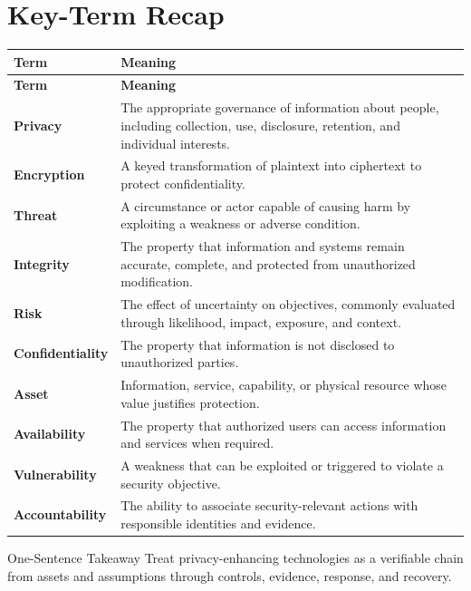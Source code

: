 \documentclass[11pt,letterpaper]{article}
\begin{document}
\section*{Key-Term Recap}
\begin{longtable}{>{\raggedright\arraybackslash}p{}>{\raggedright\arraybackslash}p{}}
\toprule\rowcolor{Navy}\color{white}\textbf{Term} & \color{white}\textbf{Meaning}\\\midrule
\endfirsthead
\toprule\rowcolor{Navy}\color{white}\textbf{Term} & \color{white}\textbf{Meaning}\\\midrule
\endhead
\textbf{Privacy} & The appropriate governance of information about people, including collection, use, disclosure, retention, and individual interests. \\\midrule
\textbf{Encryption} & A keyed transformation of plaintext into ciphertext to protect confidentiality. \\\midrule
\textbf{Threat} & A circumstance or actor capable of causing harm by exploiting a weakness or adverse condition. \\\midrule
\textbf{Integrity} & The property that information and systems remain accurate, complete, and protected from unauthorized modification. \\\midrule
\textbf{Risk} & The effect of uncertainty on objectives, commonly evaluated through likelihood, impact, exposure, and context. \\\midrule
\textbf{Confidentiality} & The property that information is not disclosed to unauthorized parties. \\\midrule
\textbf{Asset} & Information, service, capability, or physical resource whose value justifies protection. \\\midrule
\textbf{Availability} & The property that authorized users can access information and services when required. \\\midrule
\textbf{Vulnerability} & A weakness that can be exploited or triggered to violate a security objective. \\\midrule
\textbf{Accountability} & The ability to associate security-relevant actions with responsible identities and evidence. \\\midrule
\bottomrule
\end{longtable}
\begin{CornellExamBox}{One-Sentence Takeaway}
Treat privacy-enhancing technologies as a verifiable chain from assets and assumptions through controls, evidence, response, and recovery.
\end{CornellExamBox}
\end{document}

